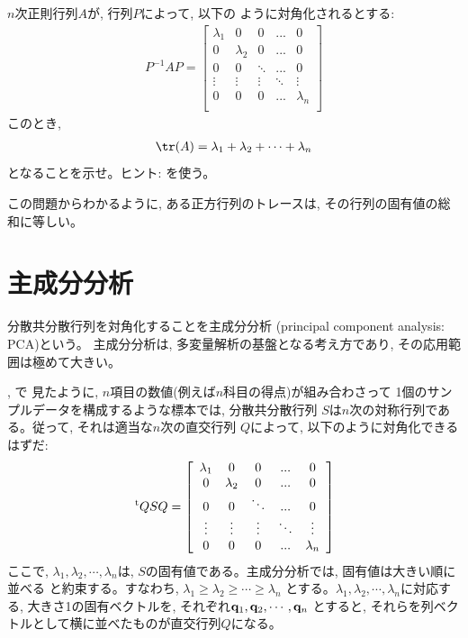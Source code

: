 \begin{q}\label{q:matrix_trace_PAP} $n$次正則行列$A$が, 行列$P$によって, 以下の
ように対角化されるとする:
\begin{eqnarray*}P^{-1}AP=\begin{bmatrix}
\lambda_1 & 0         & 0       &...     & 0\\
0         & \lambda_2 & 0       &...     & 0\\
0         & 0         & \ddots  &...     & 0\\
\vdots    & \vdots    & \vdots  & \ddots & \vdots\\
0         & 0         & 0       &...     &\lambda_n\\
\end{bmatrix}\end{eqnarray*}
このとき, 
\begin{eqnarray}
\tr(A)=\lambda_1+\lambda_2+\cdots+\lambda_n
\end{eqnarray}
となることを示せ。ヒント: を使う。\end{q}

この問題からわかるように, ある正方行列のトレースは, その行列の固有値の総和に等しい。
\vv


\section{主成分分析}

分散共分散行列を対角化することを主成分分析 (principal component analysis: PCA)という。
主成分分析は, 多変量解析の基盤となる考え方であり, その応用範囲は極めて大きい。

, で
見たように, $n$項目の数値(例えば$n$科目の得点)が組み合わさって
1個のサンプルデータを構成するような標本では, 分散共分散行列
$S$は$n$次の対称行列である。従って, それは適当な$n$次の直交行列
$Q$によって, 以下のように対角化できるはずだ:
\begin{eqnarray}\,^{\text t}QSQ=\left[\begin{array}{ccccc}
\lambda_1 & 0         & 0       &...     & 0\\
0         & \lambda_2 & 0       &...     & 0\\
0         & 0         & \ddots  &...     & 0\\
\vdots    & \vdots    & \vdots  & \ddots & \vdots\\
0         & 0         & 0       &...     &\lambda_n\\
\end{array}\right]\label{eq:tQsQ_diag}\end{eqnarray}
ここで, $\lambda_1, \lambda_2, \cdots, \lambda_n$は, 
$S$の固有値である。主成分分析では, 固有値は大きい順に並べる
と約束する。すなわち, $\lambda_1 \ge \lambda_2 \ge \cdots \ge \lambda_n$
とする。$\lambda_1, \lambda_2, \cdots, \lambda_n$に対応する, 
大きさ1の固有ベクトルを, それぞれ${\bf q}_1, {\bf q}_2, \cdots, {\bf q}_n$
とすると, それらを列ベクトルとして横に並べたものが直交行列$Q$になる。\\

